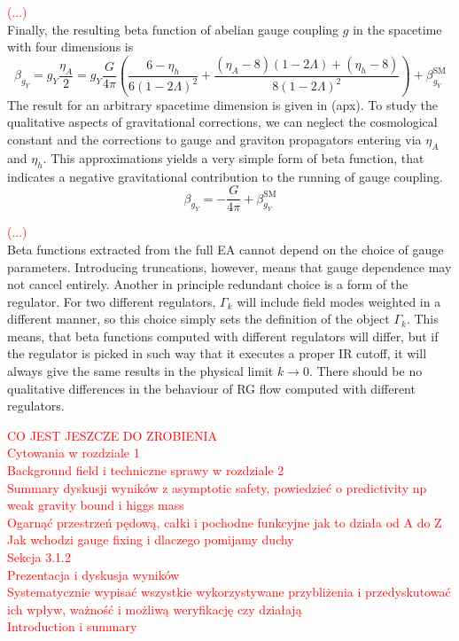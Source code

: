 \documentclass[11pt, a4paper]{article}
\begin{document}
\textcolor{red}{(...)}\\

Finally, the resulting beta function of abelian gauge coupling $g$ in the spacetime with four dimensions is
\begin{equation}
    \beta_{g_Y} = g_Y \frac{\eta_A}{2} = g_Y \frac{G}{4 \pi} \left( \frac{6 - \eta_h}{6(1-2 \Lambda)^2} + 
    \frac{(\eta_A-8)(1-2\Lambda) + (\eta_h -8)}{8 (1-2 \Lambda )^2}\right) + \beta_{g_Y}^{\text{SM}}
\end{equation}
The result for an arbitrary spacetime dimension is given in (apx).
To study the qualitative aspects of gravitational corrections, we can neglect the cosmological constant and
the corrections to gauge and graviton propagators entering via $\eta_A$ and $\eta_h$. This approximations
yields a very simple form of beta function, that indicates a negative gravitational contribution to the running
of gauge coupling.
\begin{equation}
    \beta_{g_Y} = - \frac{G}{4 \pi} + \beta_{g_Y}^{\text{SM}}
\end{equation}

\textcolor{red}{(...)}\\

Beta functions extracted from the full EA cannot depend on the choice of gauge parameters.
Introducing truncations, however, means that gauge dependence may not cancel entirely.
Another in principle redundant choice is a form of the regulator. For two different regulators,
$\Gamma_k$ will include field modes weighted in a different manner, so this choice simply
sets the definition of the object $\Gamma_k$. 
This means, that beta functions computed with different regulators will differ, but
if the regulator is picked in such way that it executes a proper IR cutoff,
it will always give the same results in the physical limit $k \rightarrow 0$. There should be no
qualitative differences in the behaviour of RG flow computed with different regulators.

\textcolor{red}{
CO JEST JESZCZE DO ZROBIENIA\\
Cytowania w rozdziale 1\\
Background field i techniczne sprawy w rozdziale 2\\
Summary dyskusji wyników z asymptotic safety, powiedzieć o predictivity np weak gravity bound i higgs mass\\
Ogarnąć przestrzeń pędową, całki i pochodne funkcyjne jak to działa od A do Z\\
Jak wchodzi gauge fixing i dlaczego pomijamy duchy\\
Sekcja 3.1.2\\
Prezentacja i dyskusja wyników\\
Systematycznie wypisać wszystkie wykorzystywane przybliżenia i przedyskutować ich wpływ, ważność i możliwą weryfikację czy działają\\
Introduction i summary
}
\end{document}
